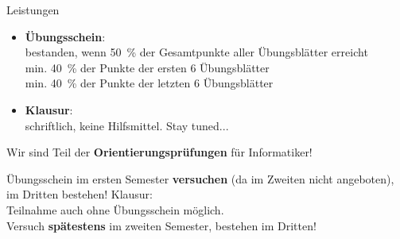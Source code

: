 \begin{frame}[t]{Leistungen}
	\begin{itemize}
		\item \textbf{Übungsschein}: \\
			bestanden, wenn 50~\% der Gesamtpunkte aller Übungsblätter erreicht\\
			min. 40~\% der Punkte der ersten 6 Übungsblätter \\
			min. 40~\% der Punkte der letzten 6 Übungsblätter \\
		\item \textbf{Klausur}: \Klausurtermin \\
			  schriftlich, keine Hilfsmittel. \quad Stay tuned... 
	\end{itemize}
	\pause
	Wir sind Teil der \textbf{Orientierungsprüfungen} für Informatiker!
	\begin{itemize}
		\implitem Übungsschein im ersten Semester \textbf{versuchen} (da im Zweiten nicht angeboten), im Dritten bestehen! 
		\implitem Klausur: \\
		Teilnahme auch ohne Übungsschein möglich. \\
		Versuch \textbf{spätestens} im zweiten Semester, bestehen im Dritten!
	\end{itemize}
\end{frame}

